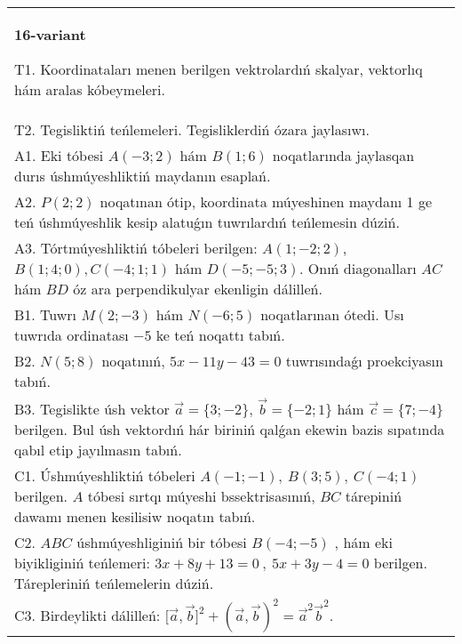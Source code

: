 \documentclass{article}
\begin{document}
\begin{tabular}{m{17cm}}
\textbf{16-variant}
\newline

T1. 
Koordinataları menen berilgen vektrolardıń skalyar, vektorlıq hám aralas kóbeymeleri. \\
T2. 
Tegisliktiń teńlemeleri. Tegisliklerdiń ózara jaylasıwı.
 \\
A1. 
Eki tóbesi $A(-3; 2)$ hám $B(1; 6)$ noqatlarında
jaylasqan durıs úshmúyeshliktiń maydanın esaplań.
 \\
A2. 
$P(2;2)$ noqatınan ótip, koordinata múyeshinen 
maydanı 1 ge teń úshmúyeshlik kesip alatuǵın tuwrılardıń 
teńlemesin dúziń.
 \\
A3. 
Tórtmúyeshliktiń tóbeleri berilgen:
$A (1; - 2;2) $, $B (1;4;0),C (- 4;1;1) $ hám $D (- 5; -5;3) $. Onıń diagonalları $AC$ hám $BD$ óz ara 
perpendikulyar ekenligin dálilleń.
 \\
B1. 
Tuwrı \(M(2;-3)\) hám \(N(-6;5)\) noqatlarınan ótedi.
Usı tuwrıda ordinatası $-5$ ke teń noqattı tabıń.
 \\
B2. 
\(N(5;8)\) noqatınıń, \(5x-11y-43=0\) tuwrısındaǵı
proekciyasın tabıń.
 \\
B3. Tegislikte úsh vektor $\vec{a} = \{ 3; - 2\}$, $\vec{b} = \{ - 2;1\}$ hám $\vec{c} = \{ 7; - 4\}$ berilgen. Bul úsh vektordıń hár biriniń qalǵan ekewin bazis sıpatında qabıl etip jayılmasın tabıń.
 \\
C1. 
Úshmúyeshliktiń tóbeleri
\(A( - 1; - 1),\ B(3;5),\ C( - 4;1)\) berilgen. $A$ tóbesi sırtqı
múyeshi bssektrisasınıń, $BC$ tárepiniń dawamı menen kesilisiw
noqatın tabıń.
 \\
C2. 
$ABC$ úshmúyeshliginiń bir tóbesi \(B( - 4; - 5)\) ,
hám eki biyikliginiń teńlemeri:
\(3x + 8y + 13 = 0\ ,\ 5x + 3y - 4 = 0\) berilgen. Tárepleriniń
teńlemelerin dúziń.
 \\
C3. 
Birdeylikti dálilleń: \(\lbrack\vec{a},\vec{b}\rbrack^{2} + (\vec{a},\vec{b}) ^{2} = {\vec{a}}^{2}{\vec{b}}^{2}\).
 \\

\end{tabular}
\vspace{1cm}
\end{document}
